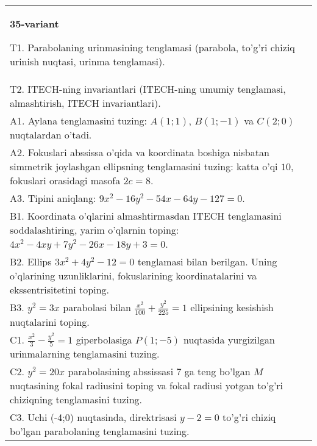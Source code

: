 \documentclass{article}
\begin{document}
\begin{tabular}{m{17cm}}
\textbf{35-variant}
\newline

T1. Parabolaning urinmasining tenglamasi (parabola, to'g'ri chiziq urinish nuqtasi, urinma tenglamasi).\\

T2. ITECH-ning invariantlari (ITECH-ning umumiy tenglamasi, almashtirish, ITECH invariantlari).\\

A1. Aylana tenglamasini tuzing: $A(1;1)$, $B(1;-1)$ va $C(2;0)$ nuqtalardan o'tadi.\\

A2. Fokuslari abssissa o'qida va koordinata boshiga nisbatan simmetrik joylashgan ellipsning tenglamasini tuzing: katta o'qi $10$, fokuslari orasidagi masofa $2c=8$.\\

A3. Tipini aniqlang: $9x^{2}-16y^{2}-54x-64y-127=0$.\\

B1. Koordinata o'qlarini almashtirmasdan ITECH tenglamasini soddalashtiring, yarim o'qlarnin toping: $4x^{2} - 4xy + 7y^{2} - 26x - 18y + 3 = 0$.\\

B2. Ellips $3x^{2} + 4y^{2} - 12 = 0$ tenglamasi bilan berilgan. Uning o'qlarining uzunliklarini, fokuslarining koordinatalarini va ekssentrisitetini toping.  \\

B3. $y^{2} = 3x$ parabolasi bilan $\frac{x^{2}}{100} + \frac{y^{2}}{225} = 1$ ellipsining kesishish nuqtalarini toping.  \\

C1. $\frac{x^{2}}{3} - \frac{y^{2}}{5} = 1$ giperbolasiga $P(1; - 5)$ nuqtasida yurgizilgan urinmalarning tenglamasini tuzing.\\

C2. $y^{2} = 20x$ parabolasining abssissasi 7 ga teng bo'lgan $M$ nuqtasining fokal radiusini toping va fokal radiusi yotgan to'g'ri chiziqning tenglamasini tuzing.  \\

C3. Uchi (-4;0) nuqtasinda, direktrisasi $y - 2 = 0$ to'g'ri chiziq bo'lgan parabolaning tenglamasini tuzing.\\

\end{tabular}
\vspace{1cm}
\end{document}
